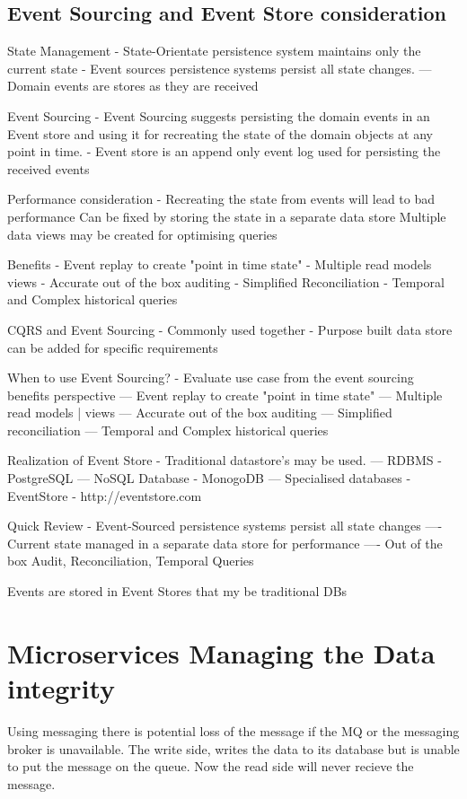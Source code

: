 

\section{Event Sourcing and Event Store consideration}

State Management
- State-Orientate persistence system maintains only the current state
- Event sources persistence systems persist all state changes.
--- Domain events are stores as they are received

Event Sourcing
- Event Sourcing suggests persisting the domain events in an Event store and using it for recreating the state of the domain objects at any point in time.
- Event store is an append only event log used for persisting the received events

Performance consideration - Recreating the state from events will lead to bad performance
Can be fixed by storing the state in a separate data store
Multiple data views may be created for optimising queries

Benefits
- Event replay to create "point in time state"
- Multiple read models views
- Accurate out of the box auditing
- Simplified Reconciliation
- Temporal and Complex historical queries

CQRS and Event Sourcing
- Commonly used together
- Purpose built data store can be added for specific requirements

When to use Event Sourcing?
- Evaluate use case from the event sourcing benefits perspective
--- Event replay to create "point in time state"
--- Multiple read models | views
--- Accurate out of the box auditing
--- Simplified reconciliation
--- Temporal and Complex historical queries

Realization of Event Store
- Traditional datastore's may be used.
--- RDBMS - PostgreSQL
--- NoSQL Database - MonogoDB
--- Specialised databases - EventStore - http://eventstore.com

Quick Review
- Event-Sourced persistence systems persist all state changes
---- Current state managed in a separate data store for performance
---- Out of the box Audit, Reconciliation, Temporal Queries

Events are stored in Event Stores that my be traditional DBs


\chapter{Microservices Managing the Data integrity}
Using messaging there is potential loss of the message if the MQ or the messaging broker is unavailable.
The write side, writes the data to its database but is unable to put the message on the queue.
Now the read side will never recieve the message.

